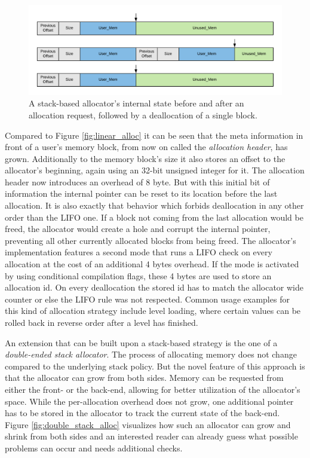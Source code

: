 \begin{figure}[h!]
	\centering \includegraphics[width=\linewidth]{PICs/stack_alloc.png}
	\caption{A stack-based allocator's internal state before and after an allocation request, followed by a deallocation of a single block.}
	\label{fig:stack_alloc}
\end{figure}

\noindent
Compared to Figure \ref{fig:linear_alloc} it can be seen that the meta information in front of a user's memory block, from now on called the \textit{allocation header}, has grown. Additionally to the memory block's size it also stores an offset to the allocator's beginning, again using an 32-bit unsigned integer for it. The allocation header now introduces an overhead of 8 byte. But with this initial bit of information the internal pointer can be reset to its location before the last allocation. It is also exactly that behavior which forbids deallocation in any other order than the \ac{LIFO} one. If a block not coming from the last allocation would be freed, the allocator would create a hole and corrupt the internal pointer, preventing all other currently allocated blocks from being freed. The allocator's implementation features a second mode that runs a \ac{LIFO} check on every allocation at the cost of an additional 4 bytes overhead. If the mode is activated by using conditional compilation flags, these 4 bytes are used to store an allocation id. On every deallocation the stored id has to match the allocator wide counter or else the \ac{LIFO} rule was not respected. Common usage examples for this kind of allocation strategy include level loading, where certain values can be rolled back in reverse order after a level has finished.

An extension that can be built upon a stack-based strategy is the one of a \textit{double-ended stack allocator}. The process of allocating memory does not change compared to the underlying stack policy. But the novel feature of this approach is that the allocator can grow from both sides. Memory can be requested from either the front- or the back-end, allowing for better utilization of the allocator's space. While the per-allocation overhead does not grow, one additional pointer has to be stored in the allocator to track the current state of the back-end. Figure \ref{fig:double_stack_alloc} visualizes how such an allocator can grow and shrink from both sides and an interested reader can already guess what possible problems can occur and needs additional checks. 

